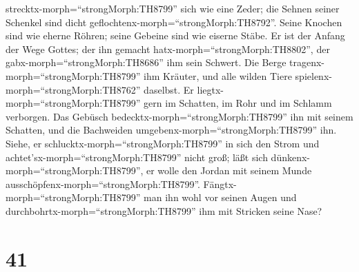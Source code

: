 strecktx-morph=``strongMorph:TH8799'' sich wie eine Zeder; die Sehnen
seiner Schenkel sind dicht geflochtenx-morph=``strongMorph:TH8792''.
 Seine Knochen sind wie eherne Röhren; seine Gebeine sind
wie eiserne Stäbe.  Er ist der Anfang der Wege Gottes; der
ihn gemacht hatx-morph=``strongMorph:TH8802'', der
gabx-morph=``strongMorph:TH8686'' ihm sein Schwert.  Die
Berge tragenx-morph=``strongMorph:TH8799'' ihm Kräuter, und alle wilden
Tiere spielenx-morph=``strongMorph:TH8762'' daselbst.  Er
liegtx-morph=``strongMorph:TH8799'' gern im Schatten, im Rohr und im
Schlamm verborgen.  Das Gebüsch
bedecktx-morph=``strongMorph:TH8799'' ihn mit seinem Schatten, und die
Bachweiden umgebenx-morph=``strongMorph:TH8799'' ihn. 
Siehe, er schlucktx-morph=``strongMorph:TH8799'' in sich den Strom und
achtet'sx-morph=``strongMorph:TH8799'' nicht groß; läßt sich
dünkenx-morph=``strongMorph:TH8799'', er wolle den Jordan mit seinem
Munde ausschöpfenx-morph=``strongMorph:TH8799''. 
Fängtx-morph=``strongMorph:TH8799'' man ihn wohl vor seinen Augen und
durchbohrtx-morph=``strongMorph:TH8799'' ihm mit Stricken seine Nase?

\hypertarget{section-40}{%
\section{41}\label{section-40}}

